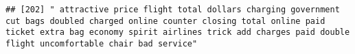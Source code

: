\documentclass[
]{article}
\begin{document}
\begin{verbatim}
## [202] " attractive price flight total dollars charging government cut bags doubled charged online counter closing total online paid ticket extra bag economy spirit airlines trick add charges paid double flight uncomfortable chair bad service"                                                                                                                                                                                                                                                                                                                                                                                                                                                                                                                                                                                                                                                                                                                                                                                                                                                                                                                                                                                                                                                                                                                                                                                                                                                                                                                                                                                                                                                                                                                                                    

\end{verbatim}
\end{document}
